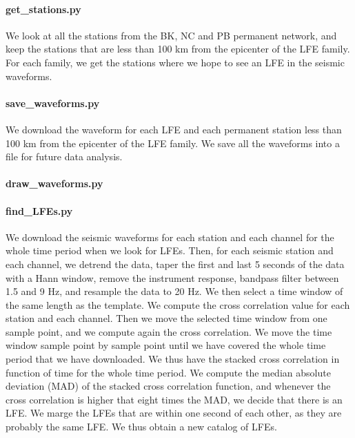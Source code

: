 \documentclass[workdone.tex]{subfiles}
\begin{document}
\paragraph{get\_stations.py} We look at all the stations from the BK, NC and PB permanent network, and keep the stations that are less than 100 km from the epicenter of the LFE family. For each family, we get the stations where we hope to see an LFE in the seismic waveforms.

\paragraph{save\_waveforms.py} We download the waveform for each LFE and each permanent station less than 100 km from the epicenter of the LFE family. We save all the waveforms into a file for future data analysis.

\paragraph{draw\_waveforms.py}

\paragraph{find\_LFEs.py} We download the seismic waveforms for each station and each channel for the whole time period when we look for LFEs. Then, for each seismic station and each channel, we detrend the data, taper the first and last 5 seconds of the data with a Hann window, remove the instrument response, bandpass filter between 1.5 and 9 Hz, and resample the data to 20 Hz. We then select a time window of the same length as the template. We compute the cross correlation value for each station and each channel. Then we move the selected time window from one sample point, and we compute again the cross correlation. We move the time window sample point by sample point until we have covered the whole time period that we have downloaded. We thus have the stacked cross correlation in function of time for the whole time period. We compute the median absolute deviation (MAD) of the stacked cross correlation function, and whenever the cross correlation is higher that eight times the MAD, we decide that there is an LFE. We marge the LFEs that are within one second of each other, as they are probably the same LFE. We thus obtain a new catalog of LFEs.
\end{document}
